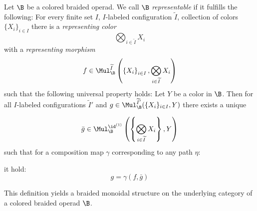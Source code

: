 

\begin{defin}
    Let $\B$ be a colored braided operad. We call $\B$ \emph{representable} if
    it fulfills the following: For every finite set $I$, $I$-labeled
    configuration $\widetilde{I}$, collection of colors $\{X_i\}_{i \in I}$
    there is a \emph{representing color}
    \[
    \bigotimes_{i \in \widetilde{I}} X_i
    \]
    with a \emph{representing morphism}
    \[
    f \in \Mul_{\B}^{\widetilde{I}}\left(\left\{X_i\right\}_{i \in I}, \bigotimes_{i \in \widetilde{I}} X_i\right)
    \]
    such that the following universal property holds: Let $Y$ be a color in
    $\B$. Then for all $I$-labeled configurations $\widetilde{I}'$ and $g \in
    \Mul_{\B}^{\widetilde{I}'}(\{X_i\}_{i \in I}, Y)$ there exists a unique

    $$\bar{g} \in \Mul_{\B}^{\id^{(1)}}\left(\left\{\bigotimes_{i \in
    \widetilde{I}} X_i\right\}, Y\right)$$
    such that for a composition map $\gamma$ corresponding to any path $\eta$:
    \begin{center}
    \end{center}
    it hold:
    \[
        g = \gamma(f, \bar{g})
    \]
\end{defin}

This definition yields a braided monoidal structure on the underlying category
of a colored braided operad $\B$.

